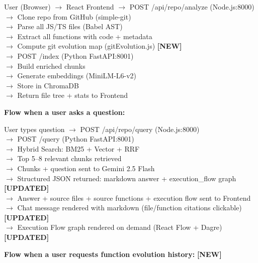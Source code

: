 \documentclass[a4paper,11pt]{article}
\begin{document}
\begin{mdframed}[style=flowbox]
\ttfamily\small
User (Browser) $\rightarrow$ React Frontend $\rightarrow$ POST /api/repo/analyze (Node.js:8000)\\
\quad$\rightarrow$ Clone repo from GitHub (simple-git)\\
\quad$\rightarrow$ Parse all JS/TS files (Babel AST)\\
\quad$\rightarrow$ Extract all functions with code + metadata\\
\quad$\rightarrow$ Compute git evolution map (gitEvolution.js) \textbf{[NEW]}\\
\quad$\rightarrow$ POST /index (Python FastAPI:8001)\\
\quad$\rightarrow$ Build enriched chunks\\
\quad$\rightarrow$ Generate embeddings (MiniLM-L6-v2)\\
\quad$\rightarrow$ Store in ChromaDB\\
\quad$\rightarrow$ Return file tree + stats to Frontend
\end{mdframed}

\noindent\textbf{Flow when a user asks a question:}

\begin{mdframed}[style=flowbox]
\ttfamily\small
User types question $\rightarrow$ POST /api/repo/query (Node.js:8000)\\
\quad$\rightarrow$ POST /query (Python FastAPI:8001)\\
\quad$\rightarrow$ Hybrid Search: BM25 + Vector + RRF\\
\quad$\rightarrow$ Top 5--8 relevant chunks retrieved\\
\quad$\rightarrow$ Chunks + question sent to Gemini 2.5 Flash\\
\quad$\rightarrow$ Structured JSON returned: markdown answer + execution\_flow graph \textbf{[UPDATED]}\\
\quad$\rightarrow$ Answer + source files + source functions + execution flow sent to Frontend\\
\quad$\rightarrow$ Chat message rendered with markdown (file/function citations clickable) \textbf{[UPDATED]}\\
\quad$\rightarrow$ Execution Flow graph rendered on demand (React Flow + Dagre) \textbf{[UPDATED]}
\end{mdframed}

\noindent\textbf{Flow when a user requests function evolution history:} \textbf{[NEW]}
\end{document}
